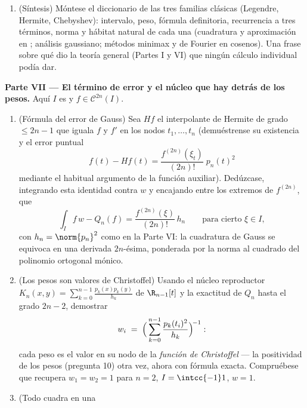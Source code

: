 \begin{problem}
\begin{enumerate}[resume]
  valores propios de una matriz real simétrica --- lo que vuelve a
  demostrar en una línea que son reales y (con el entrelazado anterior)
  ata los  al mundo
  espectral del~\cref{ch:b3:spectral}. \item (Síntesis) Móntese el
  diccionario de las tres familias clásicas (Legendre, Hermite,
  Chebyshev): intervalo, peso, fórmula definitoria, recurrencia a tres
  términos, norma y hábitat natural de cada una (cuadratura y
  aproximación en ; análisis gaussiano; métodos minimax y de
  Fourier en cosenos). Una frase sobre qué dio la teoría general (Partes
  I y VI) que ningún cálculo individual podía dar.
\end{enumerate}

\medskip
\noindent\textbf{Parte VII --- El término de error y el núcleo que hay
detrás de los pesos.} Aquí $I$ es
 y $f \in \mathcal
C^{2n}(I)$.
\begin{enumerate}[resume]
  \item (Fórmula del error de Gauss) Sea $Hf$ el interpolante de Hermite
  de grado $\leq 2n - 1$ que iguala $f$ y $f'$ en los nodos
  $t_1, \dots, t_n$ (demuéstrense su existencia y el error puntual
        \[
        f(t) - Hf(t) =
        \frac{f^{(2n)}(\xi_t)}{(2n)!}\;p_n(t)^2
        \]
        mediante el habitual argumento de la función auxiliar).
        Dedúzcase, integrando esta identidad contra $w$ y encajando
        entre los extremos de $f^{(2n)}$, que
        \[
        \int_I f\,w - Q_n(f)
        = \frac{f^{(2n)}(\xi)}{(2n)!}\,h_n
        \qquad\text{para cierto } \xi \in I,
        \]
        con $h_n = \norm{p_n}^2$ como en la Parte VI: la cuadratura de
        Gauss se equivoca en una derivada $2n$-ésima, ponderada por la
        norma al cuadrado del polinomio ortogonal mónico. \item (Los
        pesos son valores de Christoffel) Usando el núcleo reproductor
        $K_n(x, y) = \sum_{k=0}^{n-1}
        \frac{p_k(x)p_k(y)}{h_k}$ de $\R_{n-1}[t]$ y la exactitud de
        $Q_n$ hasta el grado $2n - 2$, demostrar
        \[
        w_i \;=\;
        \Bigl(\,\sum_{k=0}^{n-1}
        \frac{p_k(t_i)^2}{h_k}\Bigr)^{\!-1} :
        \]
        cada peso es el valor en su nodo de la \emph{función de
        Christoffel} --- la positividad de los pesos (pregunta 10) otra
        vez, ahora con fórmula exacta. Compruébese que recupera
        $w_1 = w_2 = 1$ para $n =
        2$, $I = \intcc{-1}1$, $w = 1$. \item (Todo cuadra en una

\end{enumerate}
\end{problem}
